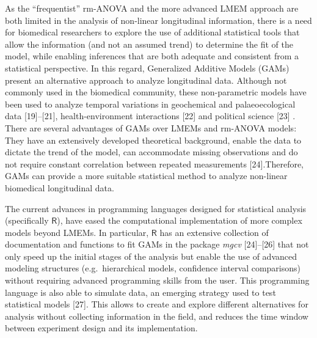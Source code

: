 \documentclass[
]{article}
\begin{document}
As the ``frequentist'' rm-ANOVA and the more advanced LMEM approach are both limited in the analysis of non-linear longitudinal information, there is a need for biomedical researchers to explore the use of additional statistical tools that allow the information (and not an assumed trend) to determine the fit of the model, while enabling inferences that are both adequate and consistent from a statistical perspective.
In this regard, Generalized Additive Models (GAMs) present an alternative approach to analyze longitudinal data. Although not commonly used in the biomedical community, these non-parametric models have been used to analyze temporal variations in geochemical and palaeoecological data {[}19{]}--{[}21{]}, health-environment interactions {[}22{]} and political science {[}23{]} . There are several advantages of GAMs over LMEMs and rm-ANOVA models: They have an extensively developed theoretical background, enable the data to dictate the trend of the model, can accommodate missing observations and do not require constant correlation between repeated measurements {[}24{]}.Therefore, GAMs can provide a more suitable statistical method to analyze non-linear biomedical longitudinal data.

The current advances in programming languages designed for statistical analysis (specifically \(\textsf{R}\)), have eased the computational implementation of more complex models beyond LMEMs. In particular, \(\textsf{R}\) has an extensive collection of documentation and functions to fit GAMs in the package \emph{mgcv} {[}24{]}--{[}26{]} that not only speed up the initial stages of the analysis but enable the use of advanced modeling structures (e.g.~hierarchical models, confidence interval comparisons) without requiring advanced programming skills from the user. This programming language is also able to simulate data, an emerging strategy used to test statistical models {[}27{]}. This allows to create and explore different alternatives for analysis without collecting information in the field, and reduces the time window between experiment design and its implementation.
\end{document}
